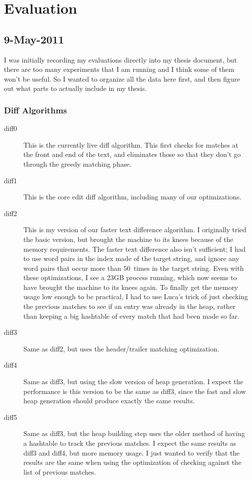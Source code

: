 \section{Evaluation}

\subsection{9-May-2011}

I was initially recording my evaluations directly into my thesis
document, but there are too many experiments that I am running
and I think some of them won't be useful.
So I wanted to organize all the data here first, and then
figure out what parts to actually include in my thesis.

\subsubsection{Diff Algorithms}

\begin{description}
\item[diff0] This is the currently live diff algorithm.
	This first checks for matches at the front and end of
	the text, and eliminates those so that they don't go
	through the greedy matching phase.
\item[diff1] This is the core edit diff algorithm, including
	many of our optimizations.
\item[diff2] This is my version of our faster text difference algorithm.
    I originally tried the basic version, but brought the machine to
    its knees because of the memory requirements.
    The faster text difference also isn't sufficient; I had to
    use word pairs in the index made of the target string,
    and ignore any word pairs that occur more than 50~times
    in the target string.  Even with these optimizations, I
    see a 23GB process running, which now seems to have brought
    the machine to its knees again.
    To finally get the memory usage low enough to be practical,
    I had to use Luca's trick of just checking the previous
    matches to see if an entry was already in the heap,
    rather than keeping a big hashtable of every match that
    had been made so far.
\item[diff3] Same as diff2, but uses the header/trailer matching
    optimization.
\item[diff4] Same as diff3, but using the slow version of heap
    generation.  I expect the performance is this version to be
    the same as diff3, since the fast and slow heap generation
    should produce exactly the same results.
\item[diff5] Same as diff3, but the heap building step uses the older
    method of having a hashtable to track the previous matches.
    I expect the same results as diff3 and diff4, but more memory usage.
    I just wanted to verify that the results are the same when
    using the optimization of checking against the list of previous
    matches.
\end{description}

